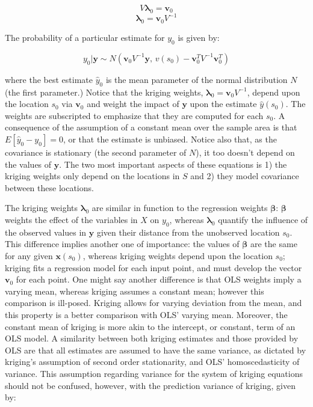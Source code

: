 \documentclass[draft]{article}
\begin{document}
\[V \bm{\lambda}_0 = \bm{v}_0 \]
\[ \bm{\lambda}_0 = \bm{v}_0 V^{-1} \]

The probability of a particular estimate for $y_0$ is given by:

\begin{equation} \label{eq:posterior}
  y_0 | \bm{y} \sim N(\bm{v}_0 V^{-1} \bm{y}, \, v(s_0)-\bm{v}_0^T V^{-1} \bm{v}_0^T)
\end{equation}

where the best estimate $\hat{y}_0$ is the mean parameter of the normal distribution $N$ (the first parameter.)  Notice that the kriging weights, $\bm{\lambda}_0=\bm{v}_0 V^{-1}$, depend upon the location $s_0$ via $\bm{v}_0$ and weight the impact of $\bm{y}$ upon the estimate $\hat{y}(s_0)$.  The weights are subscripted to emphasize that they are computed for each $s_0$.  A consequence of the assumption of a constant mean over the sample area is that $E[\hat{y}_0 - y_0]=0$, or that the estimate is unbiased.  Notice also that, as the covariance is stationary (the second parameter of $N$), it too doesn't depend on the values of $\bm{y}$.  The two most important aspects of these equations is 1) the kriging weights only depend on the locations in $S$ and 2) they model covariance between these locations.

The kriging weights $\bm{\lambda}_0$ are similar in function to the regression weights $\bm{\beta}$: $\bm{\beta}$ weights the effect of the variables in $X$ on $y_0$, whereas $\bm{\lambda}_0$ quantify the influence of the observed values in $\bm{y}$ given their distance from the unobserved location $s_0$.  This difference implies another one of importance: the values of $\bm{\beta}$ are the same for any given $\bm{x}(s_0)$, whereas kriging weights depend upon the location $s_0$; kriging fits a regression model for each input point, and must develop the vector $\bm{v}_0$ for each point.  One might say another difference is that OLS weights imply a varying mean, whereas kriging assumes a constant mean; however this comparison is ill-posed.  Kriging allows for varying deviation from the mean, and this property is a better comparison with OLS' varying mean.  Moreover, the constant mean of kriging is more akin to the intercept, or constant, term of an OLS model.  A similarity between both kriging estimates and those provided by OLS are that all estimates are assumed to have the same variance, as dictated by kriging's assumption of second order stationarity, and OLS' homoscedasticity of variance.  This assumption regarding variance for the system of kriging equations should not be confused, however, with the prediction variance of kriging, given by:
\end{document}
